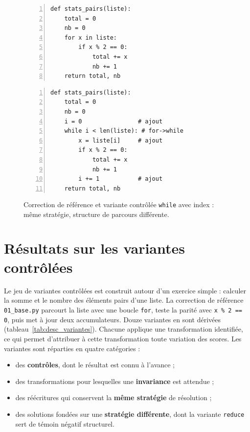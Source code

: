 \documentclass[12pt,a4paper,oneside]{report}
\begin{document}
\begin{figure}[htbp]
\centering
\begin{minipage}[t]{0.47\textwidth}
\begin{lstlisting}[style=pyncst, basicstyle=\ttfamily\footnotesize, numbers=left, numberstyle=\tiny\color{graycol},
  title={\small\texttt{01\_base.py} (référence)}]
def stats_pairs(liste):
    total = 0
    nb = 0
    for x in liste:
        if x % 2 == 0:
            total += x
            nb += 1
    return total, nb
\end{lstlisting}
\end{minipage}%
\hfill
\begin{minipage}[t]{0.47\textwidth}
\begin{lstlisting}[style=pyncst, basicstyle=\ttfamily\footnotesize, numbers=left, numberstyle=\tiny\color{graycol},
  title={\small\texttt{9\_while\_index.py} (variante)}]
def stats_pairs(liste):
    total = 0
    nb = 0
    i = 0                # ajout
    while i < len(liste): # for->while
        x = liste[i]     # ajout
        if x % 2 == 0:
            total += x
            nb += 1
        i += 1           # ajout
    return total, nb
\end{lstlisting}
\end{minipage}
\caption{Correction de référence et variante contrôlée \og \texttt{while}
avec index \fg{} : même stratégie, structure de parcours différente.}
\label{fig:exemple_variante}
\end{figure}



\section{Résultats sur les variantes contrôlées}
\label{sec:res_variantes}

Le jeu de variantes contrôlées est construit autour d'un exercice simple :
calculer la somme et le nombre des éléments pairs d'une liste. La correction
de référence \texttt{01\_base.py} parcourt la liste avec une boucle
\texttt{for}, teste la parité avec \texttt{x \% 2 == 0}, puis met à jour deux
accumulateurs. Douze variantes en sont dérivées
(tableau~\ref{tab:desc_variantes}). Chacune applique une transformation
identifiée, ce qui permet d'attribuer à cette transformation toute variation
des scores. Les variantes sont réparties en quatre catégories :
\begin{itemize}
  \item des \textbf{contrôles}, dont le résultat est connu à l'avance ;
  \item des transformations pour lesquelles une \textbf{invariance} est
        attendue ;
  \item des réécritures qui conservent la \textbf{même stratégie} de
        résolution ;
  \item des solutions fondées sur une \textbf{stratégie différente}, dont la
        variante \texttt{reduce} sert de témoin négatif structurel.
\end{itemize}
\end{document}
